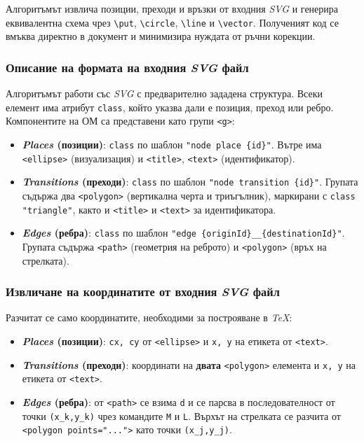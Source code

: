 Алгоритъмът извлича позиции, преходи и връзки от входния \textit{SVG} и генерира еквивалентна схема чрез \texttt{\textbackslash put}, \texttt{\textbackslash circle}, \texttt{\textbackslash line} и \texttt{\textbackslash vector}. Полученият код се вмъква директно в документ и минимизира нуждата от ръчни корекции.

\subsubsection{Описание на формата на входния \textit{SVG} файл}
\hspace*{2.5em}Алгоритъмът работи със \textit{SVG} с предварително зададена структура. Всеки елемент има атрибут \texttt{class}, който указва дали е позиция, преход или ребро. Компонентите на ОМ са представени като групи \texttt{<g>}:

\begin{itemize}
  \item \textbf{\textit{Places} (позиции)}: \texttt{class} по шаблон \texttt{"node place \{id\}"}. Вътре има \texttt{<ellipse>} (визуализация) и \texttt{<title>}, \texttt{<text>} (идентификатор).

  \item \textbf{\textit{Transitions} (преходи)}: \texttt{class} по шаблон \texttt{"node transition \{id\}"}. Групата съдържа два \texttt{<polygon>} (вертикална черта и триъгълник), маркирани с \texttt{class} \texttt{"triangle"}, както и \texttt{<title>} и \texttt{<text>} за идентификатора.

  \item \textbf{\textit{Edges} (ребра)}: \texttt{class} по шаблон \texttt{"edge \{originId\}\_\_\{destinationId\}"}. Групата съдържа \texttt{<path>} (геометрия на реброто) и \texttt{<polygon>} (връх на стрелката).
\end{itemize}

\subsubsection{Извличане на координатите от входния \textit{SVG} файл}
\hspace*{2.5em}Разчитат се само координатите, необходими за построяване в \textit{TeX}:

\begin{itemize}
  \item \textbf{\textit{Places} (позиции)}: \texttt{cx, cy} от \texttt{<ellipse>} и \texttt{x, y} на етикета от \texttt{<text>}.

  \item \textbf{\textit{Transitions} (преходи)}: координати на \textbf{двата} \texttt{<polygon>} елемента и \texttt{x, y} на етикета от \texttt{<text>}.

  \item \textbf{\textit{Edges} (ребра)}: от \texttt{<path>} се взима \texttt{d} и се парсва в последователност от точки \texttt{(x\_k,y\_k)} чрез командите \texttt{M} и \texttt{L}. Върхът на стрелката се разчита от \texttt{<polygon points="..."{}>} като точки \texttt{(x\_j,y\_j)}.
\end{itemize}

